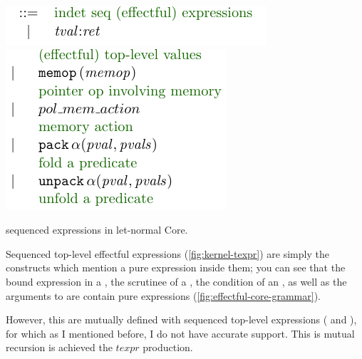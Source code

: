 \begin{marginfigure}
    \includegraphics{figures/kernel-is-expr-1}
    \includegraphics{figures/kernel-is-expr-2}
    \caption{ sequenced expressions in let-normal
        Core.}\label{fig:kernel-is-expr}
\end{marginfigure}


Sequenced top-level effectful expressions (\cref{fig:kernel-texpr}) are
simply the constructs which mention a pure expression inside them; you can see
that the bound expression in a , the scrutinee of a
, the condition of an , as well as the
arguments to  are contain pure expressions
(\cref{fig:effectful-core-grammar}).

However, this are mutually defined with  sequenced
top-level expressions ( and ), for
which as I mentioned before, I do not have accurate support. This is mutual
recursion is achieved the $\mathit{texpr}$ production.

